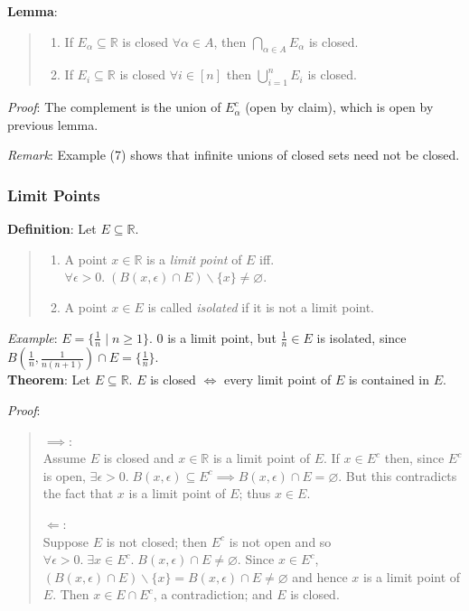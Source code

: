 \documentclass[11pt]{article}
\begin{document}
\textbf{Lemma}:
\begin{quote}\vspace{-0.3cm}
	\begin{enumerate}
	\item If $E_\alpha \subseteq \mathbb{R}$ is closed $\forall \alpha \in A$, then $\bigcap_{\alpha \in A} E_\alpha$ is closed.
	\item If $E_i \subseteq \mathbb{R}$ is closed $\forall i \in [n]$ then $\bigcup_{i=1}^n E_i$ is closed.
	\end{enumerate}
\end{quote}
\emph{Proof}: The complement is the union of $E_\alpha^c$ (open by claim), which is open by previous lemma.

\emph{Remark}: Example (7) shows that infinite unions of closed sets need not be closed.

\subsubsection{Limit Points}

\textbf{Definition}: Let $E \subseteq \mathbb{R}$.
\begin{quote}\vspace{-0.3cm}
	\begin{enumerate}
	\item A point $x \in \mathbb{R}$ is a \emph{limit point} of $E$ iff. $\forall \epsilon > 0.\; (B(x, \epsilon) \cap E) \backslash \{x\} \neq \varnothing$.
	\item A point $x \in E$ is called \emph{isolated} if it is not a limit point.
	\end{enumerate}
\end{quote}
\emph{Example}: $E = \{\frac{1}{n} \;|\; n \geq 1\}$. 0 is a limit point, but $\frac{1}{n} \in E$ is isolated, since $B(\frac{1}{n}, \frac{1}{n(n+1)}) \cap E = \{\frac{1}{n}\}$.\\

\textbf{Theorem}: Let $E \subseteq \mathbb{R}$. $E$ is closed $\iff$ every limit point of $E$ is contained in $E$.

\emph{Proof}:
\begin{quote}\vspace{-0.3cm}
$\implies$:\\
Assume $E$ is closed and $x \in \mathbb{R}$ is a limit point of $E$. If $x \in E^c$ then, since $E^c$ is open, $\exists \epsilon > 0.\; B(x, \epsilon) \subseteq E^c \implies B(x, \epsilon) \cap E = \varnothing$. But this contradicts the fact that $x$ is a limit point of $E$; thus $x \in E$.

$\Longleftarrow$:\\
Suppose $E$ is not closed; then $E^c$ is not open and so $\forall \epsilon > 0.\; \exists x \in E^c.\; B(x, \epsilon) \cap E \neq \varnothing$. Since $x \in E^c$, $(B(x, \epsilon) \cap E) \backslash \{x\} = B(x, \epsilon) \cap E \neq \varnothing$ and hence $x$ is a limit point of $E$. Then $x \in E \cap E^c$, a contradiction; and $E$ is closed.
\end{quote}
\end{document}
